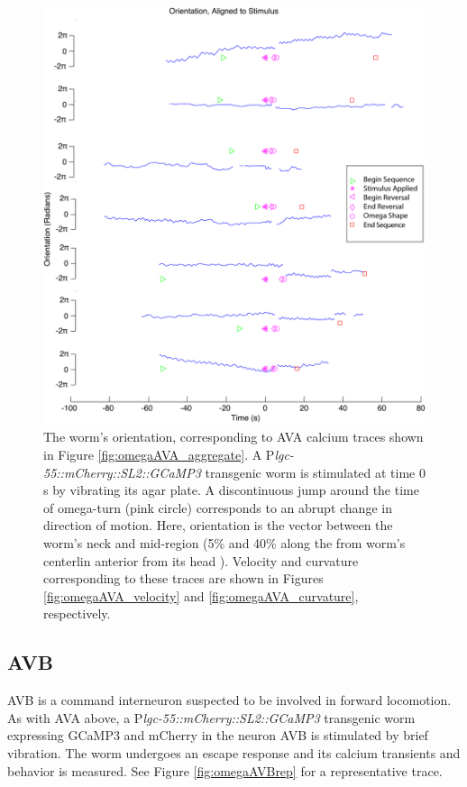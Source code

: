 \begin{figure}  %
\includegraphics[width=\textwidth]{figures/omegaAVA_orientation}
\caption[Corresponding orientation for seven sequences from four worms.]{The worm's orientation, corresponding to AVA calcium traces shown in Figure \ref{fig:omegaAVA_aggregate}. A P\textit{lgc-55::mCherry::SL2::GCaMP3} transgenic worm is stimulated at time 0 s by vibrating its agar plate. A discontinuous jump around the time of omega-turn (pink circle) corresponds to an abrupt change in direction of motion. Here, orientation is the vector between the worm's neck and mid-region (5\%  and 40\%  along the from worm's centerlin anterior from its  head ). Velocity and curvature corresponding to these traces are shown in Figures \ref{fig:omegaAVA_velocity} and \ref{fig:omegaAVA_curvature}, respectively.  \label{fig:omegaAVA_orientation}}
\end{figure}

\subsection{AVB}
AVB is a command interneuron suspected to be involved in forward locomotion.  As with AVA above, a P\textit{lgc-55::mCherry::SL2::GCaMP3} transgenic worm expressing GCaMP3 and mCherry in the neuron AVB is stimulated by brief vibration. The worm undergoes an escape response and its calcium transients and behavior is measured.  See Figure \ref{fig:omegaAVBrep} for a representative trace.


